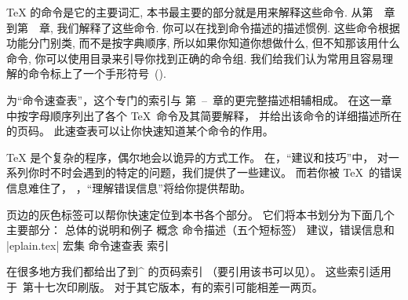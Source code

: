 \TeX{} 的命令是它的主要词汇, 本书最主要的部分就是用来解释这些命令.
从第~~章到第~~章, 我们解释了这些命令.
你可以在找到命令描述的描述惯例.
这些命令根据功能分门别类, 而不是按字典顺序,
所以如果你知道你想做什么, 但不知那该用什么命令,
你可以使用目录来引导你找到正确的命令组.
我们给我们认为常用且容易理解的命令标上了一个手形符号~(\hand).

为``命令速查表''，这个专门的索引与%
第~--~章的更完整描述相辅相成。
在这一章中按字母顺序列出了各个 \TeX\ 命令及其简要解释，
并给出该命令的详细描述所在的页码。
此速查表可以让你快速知道某个命令的作用。

\TeX{} 是个复杂的程序，偶尔地会以诡异的方式工作。
在，``建议和技巧''中，
对一系列你时不时会遇到的特定的问题，我们提供了一些建议。
而若你被 \TeX\ 的错误信息难住了，
，``理解错误信息''将给你提供帮助。

页边的灰色标签可以帮你快速定位到本书各个部分。
它们将本书划分为下面几个主要部分：
\olist
\li 总体的说明和例子
\li 概念
\li 命令描述（五个短标签）
\li 建议，错误信息和 |eplain.tex| 宏集
\li 命令速查表
\li 索引
\endolist

在很多地方我们都给出了到^{\texbook} 的页码索引
（要引用该书可以见）。
这些索引适用于\texbook\ 第十七次印刷版。
对于其它版本，有的索引可能相差一两页。


